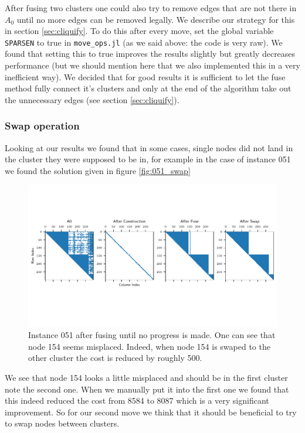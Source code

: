 After fusing two clusters one could also try to remove edges that are not there in $A_0$ until no more edges can be removed legally. We describe our strategy for this in section \ref{sec:cliquify}. To do this after every move, set the global variable \texttt{SPARSEN} to true in \texttt{move\_ops.jl} (as we said above: the code is very raw). We found that setting this to true improves the results slightly but greatly decreases performance (but we should mention here that we also implemented this in a very inefficient way). We decided that for good results it is sufficient to let the fuse method fully connect it's clusters and only at the end of the algorithm take out the unnecessary edges (see section \ref{sec:cliquify}).

\subsubsection{Swap operation}
Looking at our results we found that in some cases, single nodes did not land in the cluster they were supposed to be in, for example in the case of instance 051 we found the solution given in figure \ref{fig:051_swap}\\

\begin{figure}[h]
    \centering
    \includegraphics[width=\linewidth, trim= {0 1.8cm 0 1.8cm}, clip]{figures/spy_adjacency2.pdf}
    \caption{\label{fig:types} Instance 051 after fusing until no progress is made. One can see that node 
    154 seems misplaced. Indeed, when node 154 is swaped to the other cluster the cost is reduced by roughly 500.}
\end{figure}

We see that node 154 looks a little misplaced and should be in the first cluster note the second one. When we manually put it into the first one we found that this indeed reduced the cost from 8584 to 8087 which is a very significant improvement. So for our second move we think that it should be beneficial to try to swap nodes between clusters.\\

